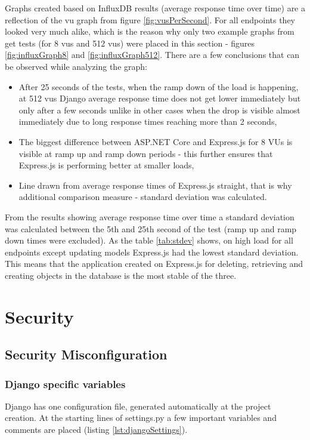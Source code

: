 Graphs created based on InfluxDB results (average response time over time) are a reflection of the \acrshort{vu} graph from figure \ref{fig:vusPerSecond}. For all endpoints they looked very much alike, which is the reason why only two example graphs from get tests (for 8 \acrshort{vu}s and 512 \acrshort{vu}s) were placed in this section - figures \ref{fig:influxGraph8} and \ref{fig:influxGraph512}. There are a few conclusions that can be observed while analyzing the graph:
\begin{itemize}
      \item After 25 seconds of the tests, when the ramp down of the load is happening, at 512 \acrshort{vu}s Django average response time does not get lower immediately but only after a few seconds unlike in other cases when the drop is visible almost immediately due to long response times reaching more than 2 seconds,
      \item The biggest difference between ASP.NET Core and Express.js for 8 VUs is visible at ramp up and ramp down periods - this further ensures that Express.js is performing better at smaller loads,
      \item Line drawn from average response times of Express.js straight, that is why additional comparison measure - standard deviation was calculated.

\end{itemize}



From the results showing average response time over time a standard deviation was calculated between the 5th and 25th second of the test (ramp up and ramp down times were excluded). As the table \ref{tab:stdev} shows, on high load for all endpoints except updating models Express.js had the lowest standard deviation. This means that the application created on Express.js for deleting, retrieving and creating objects in the database is the most stable of the three.



\section{Security}
\subsection{Security Misconfiguration}
\subsubsection{Django specific variables}
Django has one configuration file, generated automatically at the project creation. At the starting lines of settings.py a few important variables and comments are placed (listing \ref{lst:djangoSettings}).


